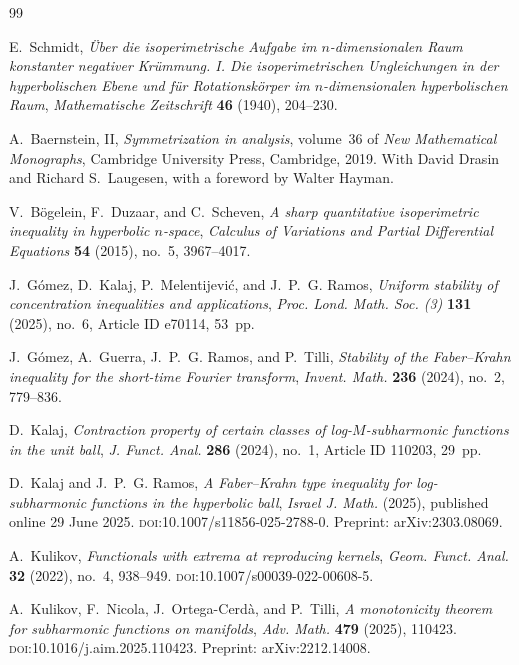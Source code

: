 \documentclass[a4paper,10pt]{amsart}
\begin{document}
\begin{thebibliography}{99}

E.~Schmidt, \emph{{\"U}ber die isoperimetrische {A}ufgabe im $n$-dimensionalen {R}aum konstanter negativer Kr{\"u}mmung. I. Die isoperimetrischen {U}ngleichungen in der hyperbolischen {E}bene und f\"ur {R}otationsk{\"o}rper im $n$-dimensionalen hyperbolischen {R}aum}, \emph{Mathematische Zeitschrift} \textbf{46} (1940), 204--230.

A.~Baernstein, II, \emph{Symmetrization in analysis}, volume~36 of \emph{New Mathematical Monographs}, Cambridge University Press, Cambridge, 2019. With David Drasin and Richard S.~Laugesen, with a foreword by Walter Hayman.

V.~B\"ogelein, F.~Duzaar, and C.~Scheven, \emph{A sharp quantitative isoperimetric inequality in hyperbolic $n$-space}, \emph{Calculus of Variations and Partial Differential Equations} \textbf{54} (2015), no.~5, 3967--4017.

J.~G{\'o}mez, D.~Kalaj, P.~Melentijevi{\'c}, and J.~P.~G. Ramos, \emph{Uniform stability of concentration inequalities and applications}, \emph{Proc. Lond. Math. Soc. (3)} \textbf{131} (2025), no.~6, Article ID e70114, 53~pp.

J.~G{\'o}mez, A.~Guerra, J.~P.~G. Ramos, and P.~Tilli, \emph{Stability of the Faber--Krahn inequality for the short-time Fourier transform}, \emph{Invent. Math.} \textbf{236} (2024), no.~2, 779--836.

D.~Kalaj, \emph{Contraction property of certain classes of log-$M$-subharmonic functions in the unit ball}, \emph{J. Funct. Anal.} \textbf{286} (2024), no.~1, Article ID 110203, 29~pp.

D.~Kalaj and J.~P.~G. Ramos, \emph{A Faber--Krahn type inequality for log-subharmonic functions in the hyperbolic ball}, \emph{Israel J. Math.} (2025), published online 29 June 2025. \textsc{doi}:10.1007/s11856-025-2788-0. Preprint: arXiv:2303.08069.

A.~Kulikov, \emph{Functionals with extrema at reproducing kernels}, \emph{Geom. Funct. Anal.} \textbf{32} (2022), no.~4, 938--949. \textsc{doi}:10.1007/s00039-022-00608-5.

A.~Kulikov, F.~Nicola, J.~Ortega-Cerd\`a, and P.~Tilli, \emph{A monotonicity theorem for subharmonic functions on manifolds}, \emph{Adv. Math.} \textbf{479} (2025), 110423. \textsc{doi}:10.1016/j.aim.2025.110423. Preprint: arXiv:2212.14008.


\end{thebibliography}
\end{document}
